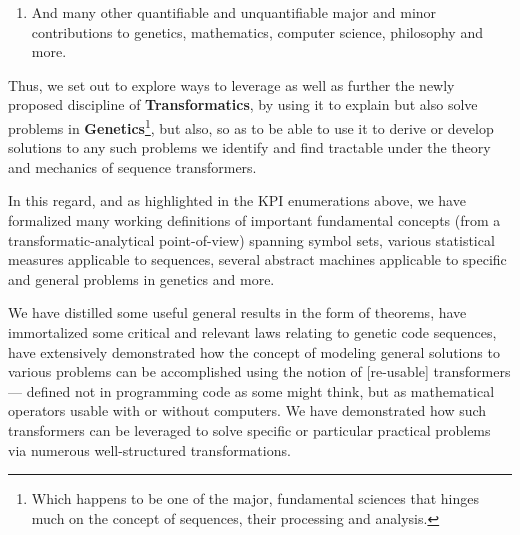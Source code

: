 \documentclass[a4paper, 18pt]{book} %
\begin{document}
\begin{enumerate}
{And as for some of the TEA programs:

\begin{enumerate}
\item \textbf{\hyperref[LSTUNSPECSS]{Listing \ref{LSTUNSPECSS}}} --- Computing Unspecific Symbol Set
\item \textbf{\hyperref[LSTSC1]{Listing \ref{LSTSC1}}} --- Computing a Sequence Characteristic
\item \textbf{\hyperref[LSTGEN2DEC]{Listing \ref{LSTGEN2DEC}}} --- Genetic Code to Decimal Code Transformer
\item \textbf{\hyperref[LSTDEC2GEN]{Listing \ref{LSTDEC2GEN}}} --- Decimal Code to Genetic Code Transformer
\item \textbf{\hyperref[LSTCONSFIL]{Listing \ref{LSTCONSFIL}}} --- Consonant Filter
\item \textbf{\hyperref[LSTSEQENTROPY]{Listing \ref{LSTSEQENTROPY}}} --- Sequence Entropy Computer
\end{enumerate}


}
\item And many other quantifiable and unquantifiable major and minor contributions to genetics, mathematics, computer science, philosophy and more.
\end{enumerate}

\vspace{1em}

Thus, we set out to explore ways to leverage as well as further the newly proposed discipline of \textbf{Transformatics}, by using it to explain but also solve problems in \textbf{Genetics}\footnote{Which happens to be one of the major, fundamental sciences that hinges much on the concept of sequences, their processing and analysis.}, but also, so as to be able to use it to derive or develop solutions to any such problems we identify and find tractable under the theory and mechanics of sequence transformers. 

In this regard, and as highlighted in the KPI enumerations above, we have formalized many working definitions of important fundamental concepts (from a transformatic-analytical point-of-view) spanning symbol sets, various statistical measures applicable to sequences, several abstract machines applicable to specific and general problems in genetics and more. 

We have distilled some useful general results in the form of theorems, have immortalized some critical and relevant laws relating to genetic code sequences, have extensively demonstrated how the concept of modeling general solutions to various problems can be accomplished using the notion of [re-usable] transformers --- defined not in programming code as some might think, but as mathematical operators usable with or without computers. We have demonstrated how such transformers can be leveraged to solve specific or particular practical problems via numerous well-structured transformations. 
\end{document}
